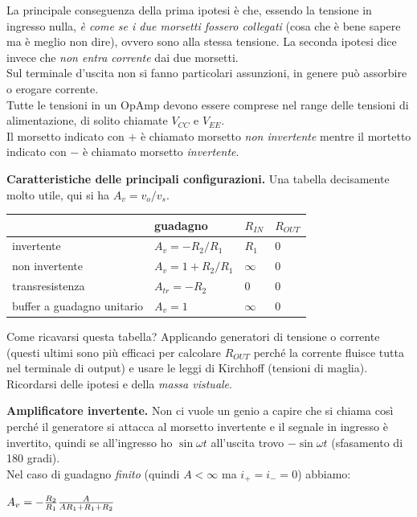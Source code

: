 \documentclass[a4paper,portrait,12pt]{article}
\theoremstyle{definition}
\begin{document}
La principale conseguenza della prima ipotesi è che, essendo la tensione in ingresso nulla, \textit{è come se
i due morsetti fossero collegati} (cosa che è bene sapere ma è meglio non dire), ovvero sono alla stessa 
tensione. La seconda ipotesi dice invece che \textit{non entra corrente} dai due morsetti.\\
Sul terminale d'uscita non si fanno particolari assunzioni, in genere può assorbire o erogare corrente.\\ 
Tutte le tensioni in un OpAmp devono essere comprese nel range delle tensioni di alimentazione, di solito 
chiamate $V_{CC}$ e $V_{EE}$.\\
Il morsetto indicato con $+$ è chiamato morsetto \textit{non invertente} mentre 
il mortetto indicato con $-$ è chiamato morsetto \textit{invertente}.
\bigskip

\textbf{Caratteristiche delle principali configurazioni.} Una tabella decisamente molto utile, qui si ha 
$A_v = v_o / v_s$.

\begin{table}[H]
\begin{center}
\begin{tabular}{|l|l|l|l|}
\hline
\hline & guadagno & $R_{IN}$ & $R_{OUT}$\\
\hline
\hline invertente & $A_v = -R_2/ R_1$ & $R_1$ & $0$\\
\hline non invertente & $A_v = 1 + R_2/ R_1$ & $\infty$ & $0$\\
\hline transresistenza & $A_{tr} = -R_2$ & $0$ & $0$\\
\hline buffer a guadagno unitario & $A_v = 1$ & $\infty$ & $0$\\
\hline
\end{tabular}
\end{center}
\end{table}

Come ricavarsi questa tabella? Applicando generatori di tensione o corrente (questi ultimi sono più efficaci 
per calcolare $R_{OUT}$ perché la corrente fluisce tutta nel terminale di output) e usare le leggi di 
Kirchhoff (tensioni di maglia). Ricordarsi delle ipotesi e della \textit{massa vistuale}.
\bigskip

\textbf{Amplificatore invertente.} Non ci vuole un genio a capire che si chiama così perché il generatore 
si attacca al morsetto invertente e il segnale in ingresso è invertito, quindi se all'ingresso ho $\sin 
\omega t$ all'uscita trovo $-\sin \omega t$ (sfasamento di 180 gradi).\\
Nel caso di guadagno \textit{finito} (quindi $A < \infty$ ma $i_+ = i_- = 0$) abbiamo:
\begin{center}
$A_v = - {R_2 \over R_1}{A \over AR_1 + R_1 + R_2}$
\end{center}
\bigskip
\end{document}

